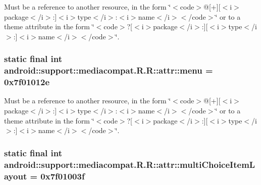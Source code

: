 Must be a reference to another resource, in the form \char`\"{}$<$code$>$@\mbox{[}+\mbox{]}\mbox{[}$<$i$>$package$<$/i$>$:\mbox{]}$<$i$>$type$<$/i$>$:$<$i$>$name$<$/i$>$$<$/code$>$\char`\"{} or to a theme attribute in the form \char`\"{}$<$code$>$?\mbox{[}$<$i$>$package$<$/i$>$:\mbox{]}\mbox{[}$<$i$>$type$<$/i$>$:\mbox{]}$<$i$>$name$<$/i$>$$<$/code$>$\char`\"{}. \hypertarget{classandroid_1_1support_1_1mediacompat_1_1_r_1_1attr_16f5f44327cff39ed806266302622585}{
\subsubsection[{menu}]{\setlength{\rightskip}{0pt plus 5cm}static final int android::support::mediacompat.R.R::attr::menu = 0x7f01012e}}
\label{classandroid_1_1support_1_1mediacompat_1_1_r_1_1attr_16f5f44327cff39ed806266302622585}


Must be a reference to another resource, in the form \char`\"{}$<$code$>$@\mbox{[}+\mbox{]}\mbox{[}$<$i$>$package$<$/i$>$:\mbox{]}$<$i$>$type$<$/i$>$:$<$i$>$name$<$/i$>$$<$/code$>$\char`\"{} or to a theme attribute in the form \char`\"{}$<$code$>$?\mbox{[}$<$i$>$package$<$/i$>$:\mbox{]}\mbox{[}$<$i$>$type$<$/i$>$:\mbox{]}$<$i$>$name$<$/i$>$$<$/code$>$\char`\"{}. \hypertarget{classandroid_1_1support_1_1mediacompat_1_1_r_1_1attr_f1830e655813e8094bbb5a7dd35fb365}{
\subsubsection[{multiChoiceItemLayout}]{\setlength{\rightskip}{0pt plus 5cm}static final int android::support::mediacompat.R.R::attr::multiChoiceItemLayout = 0x7f01003f}}
\label{classandroid_1_1support_1_1mediacompat_1_1_r_1_1attr_f1830e655813e8094bbb5a7dd35fb365}


